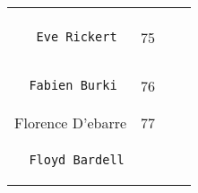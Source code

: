 \documentclass[]{article}
\begin{document}
\begin{longtable}[c]{@{}llll@{}}
\begin{minipage}[t]{0.15\columnwidth}
\end{minipage}
\\\noalign{\medskip}
\begin{minipage}[t]{0.39\columnwidth}\raggedright
\begin{verbatim}
   Eve Rickert
\end{verbatim}
\end{minipage} & \begin{minipage}[t]{0.10\columnwidth}\raggedright
75
\end{minipage} & \begin{minipage}[t]{0.13\columnwidth}\raggedright
\end{minipage} & \begin{minipage}[t]{0.15\columnwidth}\raggedright
\end{minipage}
\\\noalign{\medskip}
\begin{minipage}[t]{0.39\columnwidth}\raggedright
\begin{verbatim}
  Fabien Burki
\end{verbatim}
\end{minipage} & \begin{minipage}[t]{0.10\columnwidth}\raggedright
76
\end{minipage} & \begin{minipage}[t]{0.13\columnwidth}\raggedright
\end{minipage} & \begin{minipage}[t]{0.15\columnwidth}\raggedright
\end{minipage}
\\\noalign{\medskip}
\begin{minipage}[t]{0.39\columnwidth}\raggedright
Florence D'ebarre
\end{minipage} & \begin{minipage}[t]{0.10\columnwidth}\raggedright
77
\end{minipage} & \begin{minipage}[t]{0.13\columnwidth}\raggedright
\end{minipage} & \begin{minipage}[t]{0.15\columnwidth}\raggedright
\end{minipage}
\\\noalign{\medskip}
\begin{minipage}[t]{0.39\columnwidth}\raggedright
\begin{verbatim}
  Floyd Bardell
\end{verbatim}
\end{minipage} & \begin{minipage}[t]{0.10\columnwidth}\raggedright

\end{minipage}
\end{longtable}
\end{document}
